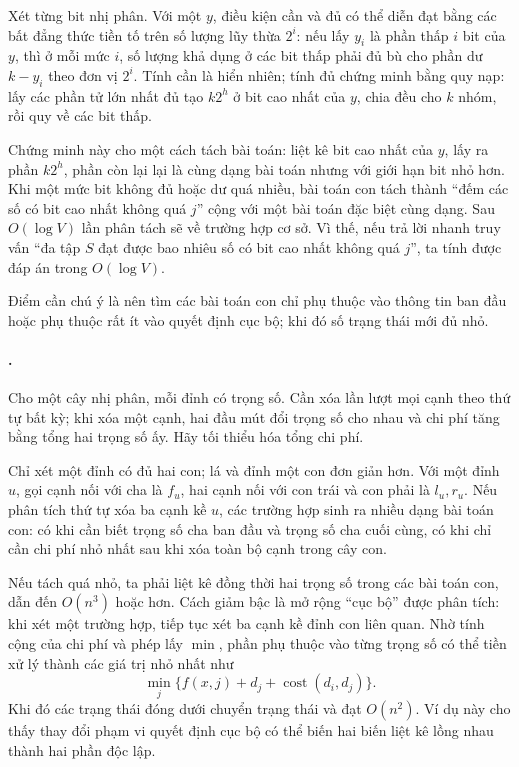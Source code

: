 \documentclass[11pt]{article}
\begin{document}
Xét từng bit nhị phân. Với một \(y\), điều kiện cần và đủ có thể diễn đạt bằng
các bất đẳng thức tiền tố trên số lượng lũy thừa \(2^i\): nếu lấy \(y_i\) là
phần thấp \(i\) bit của \(y\), thì ở mỗi mức \(i\), số lượng khả dụng ở các bit
thấp phải đủ bù cho phần dư \(k-y_i\) theo đơn vị \(2^i\). Tính cần là hiển
nhiên; tính đủ chứng minh bằng quy nạp: lấy các phần tử lớn nhất đủ tạo
\(k2^h\) ở bit cao nhất của \(y\), chia đều cho \(k\) nhóm, rồi quy về các bit
thấp.

Chứng minh này cho một cách tách bài toán: liệt kê bit cao nhất của \(y\), lấy
ra phần \(k2^h\), phần còn lại lại là cùng dạng bài toán nhưng với giới hạn bit
nhỏ hơn. Khi một mức bit không đủ hoặc dư quá nhiều, bài toán con tách thành
``đếm các số có bit cao nhất không quá \(j\)'' cộng với một bài toán đặc biệt
cùng dạng. Sau \(O(\log V)\) lần phân tách sẽ về trường hợp cơ sở. Vì thế, nếu
trả lời nhanh truy vấn ``đa tập \(S\) đạt được bao nhiêu số có bit cao nhất
không quá \(j\)'', ta tính được đáp án trong \(O(\log V)\).

Điểm cần chú ý là nên tìm các bài toán con chỉ phụ thuộc vào thông tin ban đầu
hoặc phụ thuộc rất ít vào quyết định cục bộ; khi đó số trạng thái mới đủ nhỏ.

\paragraph{.}
Cho một cây nhị phân, mỗi đỉnh có trọng số. Cần xóa lần lượt mọi cạnh theo thứ
tự bất kỳ; khi xóa một cạnh, hai đầu mút đổi trọng số cho nhau và chi phí tăng
bằng tổng hai trọng số ấy. Hãy tối thiểu hóa tổng chi phí.

Chỉ xét một đỉnh có đủ hai con; lá và đỉnh một con đơn giản hơn. Với một đỉnh
\(u\), gọi cạnh nối với cha là \(f_u\), hai cạnh nối với con trái và con phải
là \(l_u,r_u\). Nếu phân tích thứ tự xóa ba cạnh kề \(u\), các trường hợp sinh
ra nhiều dạng bài toán con: có khi cần biết trọng số cha ban đầu và trọng số
cha cuối cùng, có khi chỉ cần chi phí nhỏ nhất sau khi xóa toàn bộ cạnh trong
cây con.

Nếu tách quá nhỏ, ta phải liệt kê đồng thời hai trọng số trong các bài toán
con, dẫn đến \(O(n^3)\) hoặc hơn. Cách giảm bậc là mở rộng ``cục bộ'' được phân
tích: khi xét một trường hợp, tiếp tục xét ba cạnh kề đỉnh con liên quan. Nhờ
tính cộng của chi phí và phép lấy \(\min\), phần phụ thuộc vào từng trọng số có
thể tiền xử lý thành các giá trị nhỏ nhất như
\[
  \min_j \{ f(x,j)+d_j+\operatorname{cost}(d_i,d_j)\}.
\]
Khi đó các trạng thái đóng dưới chuyển trạng thái và đạt \(O(n^2)\). Ví dụ này
cho thấy thay đổi phạm vi quyết định cục bộ có thể biến hai biến liệt kê lồng
nhau thành hai phần độc lập.
\end{document}
